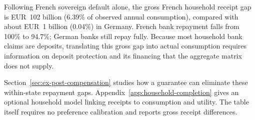Following French sovereign default alone, the gross French household receipt gap is EUR~102 billion (6.39\% of observed annual consumption), compared with about EUR~1 billion (0.04\%) in Germany. French bank repayment falls from 100\% to 94.7\%; German banks still repay fully. Because most household bank claims are deposits, translating this gross gap into actual consumption requires information on deposit protection and its financing that the aggregate matrix does not supply.

Section~\ref{sec:ex-post-compensation} studies how a guarantee can eliminate these within-state repayment gaps. Appendix~\ref{app:household-completion} gives an optional household model linking receipts to consumption and utility. The table itself requires no preference calibration and reports gross receipt differences.

